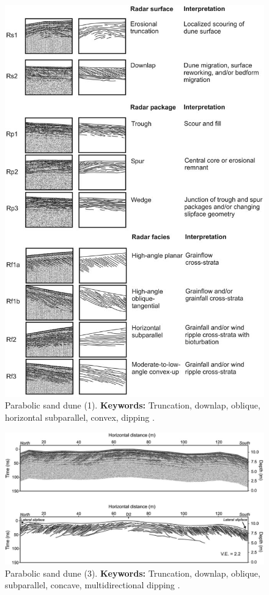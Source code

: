 \begin{figure}[h!]
    \centering
    \includegraphics[width=0.9\linewidth]{Figures/0.2GPR/Hugenholtz2007_parabolicdunes.png}
    \caption[Parabolic sand dune (1).]{Parabolic sand dune (1). \textbf{Keywords: } Truncation, downlap, oblique, horizontal subparallel, convex, dipping \citep{Hugenholtz2007}.}
    \label{fig:Hugenholtz2007-4}
\end{figure}
\clearpage

\begin{figure}[h!]
    \centering
    \includegraphics[width=0.9\linewidth]{Figures/0.2GPR/Hugenholtz_2007_3.png}
    \caption[Parabolic sand dune (3).]{Parabolic sand dune (3). \textbf{Keywords: } Truncation, downlap, oblique, subparallel, concave, multidirectional dipping \citep{Hugenholtz2007}.}
    \label{fig:Hugenholtz2007-3}
\end{figure}

